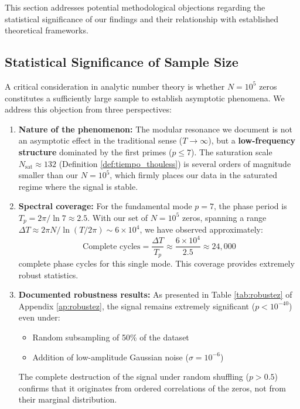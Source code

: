 \documentclass[12pt, a4paper]{article}
\theoremstyle{plain}
\theoremstyle{definition}
\theoremstyle{remark}
\begin{document}
This section addresses potential methodological objections regarding the statistical significance of our findings and their relationship with established theoretical frameworks.

\subsection{Statistical Significance of Sample Size}
\label{subsec:significancia_muestra}

A critical consideration in analytic number theory is whether $N=10^5$ zeros constitutes a sufficiently large sample to establish asymptotic phenomena. We address this objection from three perspectives:

\begin{enumerate}
    \item \textbf{Nature of the phenomenon:} The modular resonance we document is not an asymptotic effect in the traditional sense ($T \to \infty$), but a \textbf{low-frequency structure} dominated by the first primes ($p \leq 7$). The saturation scale $N_{\text{sat}} \approx 132$ (Definition \ref{def:tiempo_thouless}) is several orders of magnitude smaller than our $N=10^5$, which firmly places our data in the saturated regime where the signal is stable.
    
    \item \textbf{Spectral coverage:} For the fundamental mode $p=7$, the phase period is $T_p = 2\pi/\ln 7 \approx 2.5$. With our set of $N=10^5$ zeros, spanning a range $\Delta T \approx 2\pi N/\ln(T/2\pi) \sim 6\times10^4$, we have observed approximately:
    \[
    \text{Complete cycles} = \frac{\Delta T}{T_p} \approx \frac{6\times10^4}{2.5} \approx 24,000
    \]
    complete phase cycles for this single mode. This coverage provides extremely robust statistics.
    
    \item \textbf{Documented robustness results:} As presented in Table \ref{tab:robustez} of Appendix \ref{ap:robustez}, the signal remains extremely significant ($p < 10^{-40}$) even under:
    \begin{itemize}
        \item Random subsampling of 50\% of the dataset
        \item Addition of low-amplitude Gaussian noise ($\sigma = 10^{-6}$)
    \end{itemize}
    The complete destruction of the signal under random shuffling ($p > 0.5$) confirms that it originates from ordered correlations of the zeros, not from their marginal distribution.
\end{enumerate}
\end{document}
